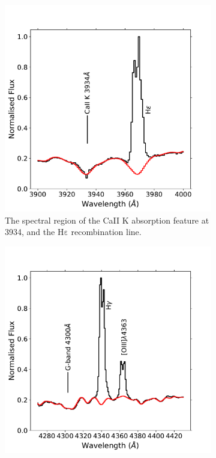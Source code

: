 \begin{figure}
\begin{subfigure}[t]{0.47\textwidth}
        \includegraphics[width=\linewidth]{figures/xshooter_ic5063/starlight_caii_hk_hep.pdf}
        \caption{The spectral region of the CaII K absorption feature at 3934\;{\AA}, and the H$\mathrm{\varepsilon}$ recombination line.}
        \label{fig: xshooter_ic5063: starlight_caii_hk_heta}
    \end{subfigure}
    \vspace{2cm}
    \begin{subfigure}[t]{0.47\textwidth}
        \includegraphics[width=\linewidth]{figures/xshooter_ic5063/starlight_hgamma_oiii4363.pdf}

\end{subfigure}
\end{figure}

